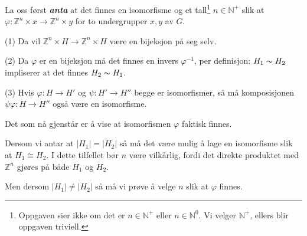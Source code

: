 \documentclass[a4paper,norsk,twocolumn,10pt]{article}
\begin{document}
La oss først \textbf{\textit{anta}} at det finnes en isomorfisme og et
tall\footnote{Oppgaven sier ikke om det er $n \in \mathbb{N}^+$ eller $n \in
\mathbb{N}^0$. Vi velger $\mathbb{N}^+$, ellers blir oppgaven triviell.} $n \in
\mathbb{N}^+$ slik at $\varphi\colon \mathbb{Z}^n \times x \rightarrow
\mathbb{Z}^n \times y$ for to undergrupper $x,y$ av $G$.

(1) Da vil $\mathbb{Z}^n \times H \rightarrow \mathbb{Z}^n \times H$ være en
bijeksjon på seg selv.

(2) Da $\varphi$ er en bijeksjon må det finnes en invers $\varphi^{-1}$, per
definisjon: $H_1 \thicksim H_2$ impliserer at det finnes $H_2 \thicksim H_1$.

(3) Hvis $\varphi\colon H \rightarrow H'$ og $\psi\colon H' \rightarrow H''$ begge
er isomorfismer, så må komposisjonen $\psi\varphi\colon H \rightarrow H''$ også
være en isomorfisme.

Det som nå gjenstår er å vise at isomorfismen $\varphi$ faktisk finnes.

Dersom vi antar at $|H_1| = |H_2|$ så må det være mulig å lage en isomorfisme
slik at $H_1 \cong H_2$. I dette tilfellet bør $n$ være vilkårlig, fordi det
direkte produktet med $\mathbb{Z}^n$ gjøres på både $H_1$ og $H_2$.

Men dersom $|H_1| \ne |H_2|$ så må vi prøve å velge $n$ slik at $\varphi$
finnes.
\end{document}
